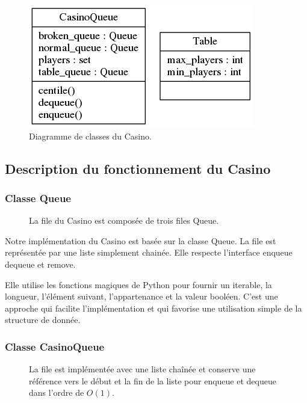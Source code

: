 \documentclass[french]{article}
\begin{document}
\begin{figure}
  \centering
  \caption{Diagramme de classes du Casino.}
  \label{figure:diagramme-casino}
  \includegraphics[resolution=130]{figures/diagramme-casino.png}
\end{figure}

\subsection{Description du fonctionnement du Casino}

\subsubsection{Classe \textsf{Queue}}

\begin{figure}
  \centering
  \label{figure:casino}
  \caption{La file du Casino est composée de trois files \textsf{Queue}.}
  
\end{figure}

Notre implémentation du Casino est basée sur la classe \textsf{Queue}. La file
est représentée par une liste simplement chainée. Elle respecte l'interface
\textsf{enqueue} \textsf{dequeue} et \textsf{remove}.

Elle utilise les fonctions magiques de Python pour fournir un iterable, la
longueur, l'élément suivant, l'appartenance et la valeur booléen. C'est une
approche qui facilite l'implémentation et qui favorise une utilisation simple de
la structure de donnée.

\subsubsection{Classe \textsf{CasinoQueue}}

\begin{figure}
\caption
{
  La file est implémentée avec une liste chaînée et conserve une référence vers
  le début et la fin de la liste pour \textsf{enqueue} et \textsf{dequeue} dans
  l'ordre de $O(1)$.
}
\label{figure:datastructures}

\end{figure}
\end{document}
